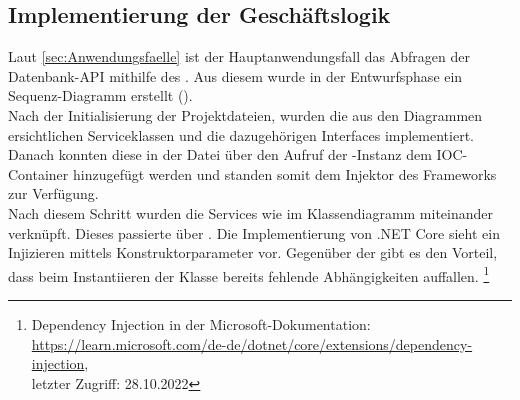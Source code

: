 \subsection{Implementierung der Geschäftslogik}
\label{sec:ImplementierungGeschaeftslogik}
Laut \ref{sec:Anwendungsfaelle}  ist der Hauptanwendungsfall
das Abfragen der Datenbank-\acs{API} mithilfe des . Aus diesem wurde in 
der Entwurfsphase ein Sequenz-Diagramm erstellt (\Vgl {}).\\
Nach der Initialisierung der Projektdateien, wurden die aus den Diagrammen ersichtlichen Serviceklassen
und die dazugehörigen Interfaces implementiert. \\Danach konnten diese in der Datei 
über den Aufruf  der -Instanz dem \acs{IOC}-Container 
hinzugefügt werden und standen somit dem Injektor des Frameworks zur Verfügung. \\Nach diesem Schritt 
wurden die Services wie im Klassendiagramm  miteinander verknüpft.
Dieses passierte über . Die Implementierung von .NET Core 
sieht ein Injizieren mittels Konstruktorparameter vor. Gegenüber der  gibt es
den Vorteil, dass beim Instantiieren der Klasse bereits fehlende Abhängigkeiten auffallen.
\footnote{Dependency Injection in der Microsoft-Dokumentation:\\ 
\url{https://learn.microsoft.com/de-de/dotnet/core/extensions/dependency-injection}, \\
letzter Zugriff: 28.10.2022}

